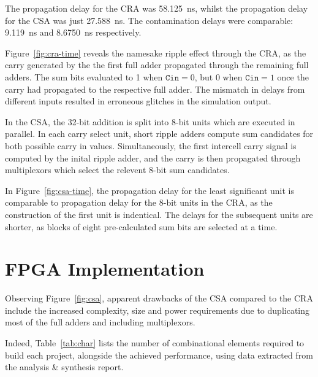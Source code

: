 \documentclass[a4paper,11pt]{article}
\begin{document}
The propagation delay for the CRA was \SI{58.125}{\ns}, whilst the propagation delay for the CSA was just \SI{27.588}{\ns}. The contamination delays were comparable: \SI{9.119}{\ns} and \SI{8.6750}{\ns} respectively.

Figure~\ref{fig:cra-time} reveals the namesake ripple effect through the CRA, as the carry generated by the the first full adder propagated through the remaining full adders. The sum bits evaluated to 1 when $\mathtt{Cin}=0$, but 0 when $\mathtt{Cin}=1$ once the carry had propagated to the respective full adder. The mismatch in delays from different inputs resulted in erroneous glitches in the simulation output.

In the CSA, the 32-bit addition is split into 8-bit units which are executed in parallel. In each carry select unit, short ripple adders compute sum candidates for both possible carry in values. Simultaneously, the first intercell carry signal is computed by the inital ripple adder, and the carry is then propagated through multiplexors which select the relevent 8-bit sum candidates.

In Figure~\ref{fig:csa-time}, the propagation delay for the least significant unit is comparable to propagation delay for the 8-bit units in the CRA, as the construction of the first unit is indentical. The delays for the subsequent units are shorter, as blocks of eight pre-calculated sum bits are selected at a time.

\section{FPGA Implementation}

Observing Figure~\ref{fig:csa}, apparent drawbacks of the CSA compared to the CRA include the increased complexity, size and power requirements due to duplicating most of the full adders and including multiplexors.

Indeed, Table~\ref{tab:char} lists the number of combinational elements required to build each project, alongside the achieved performance, using data extracted from the analysis \& synthesis report.
\end{document}
